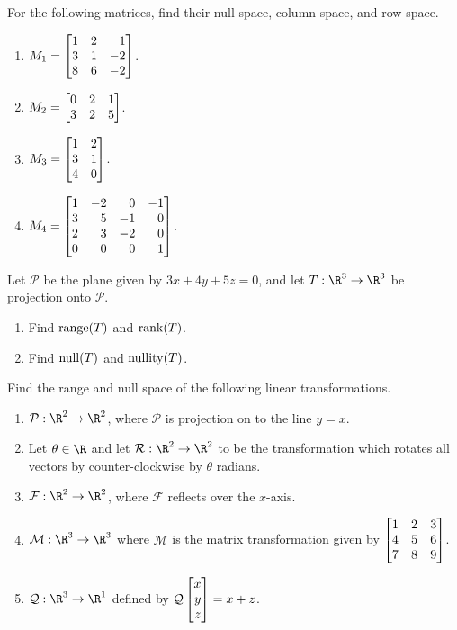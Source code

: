 \begin{exercises}
	\begin{problist}
		\prob For the following matrices, find their null space, column space,
		and row space.
		\begin{enumerate}
			\item $M_{1}=\mat{1&2&1\\3&1&-2\\8&6&-2}$.

			\item $M_{2}=\mat{0&2&1\\3&2&5}$.

			\item $M_{3}=\mat{1&2\\3&1\\4&0}$.

			\item $M_{4}=\mat{1&-2&0&-1\\3&5&-1&0\\2&3&-2&0\\0&0&0&1}$.
		\end{enumerate}

		\prob Let $\mathcal P$ be the plane given by $3x+4y+5z=0$, and
		let $T:\R^{3}\to\R^{3}$ be projection onto $\mathcal P$.
		\begin{enumerate}
			\item Find $\operatorname{range}(T)$ and $\operatorname{rank}(T)$.

			\item Find $\operatorname{null}(T)$ and $\operatorname{nullity}(T)$.
		\end{enumerate}

		\prob Find the range and null space of the following linear
		transformations.
		\begin{enumerate}
			\item $\mathcal P:\R^{2}\to\R^{2}$, where
				$\mathcal P$ is projection on to the line
				$y=x$.

			\item Let $\theta\in \R$ and let $\mathcal R:\R^{2}\to\R^{2}$
				to be the transformation which rotates all vectors
				by counter-clockwise by $\theta$ radians.

			\item $\mathcal F:\R^{2}\to\R^{2}$, where
				$\mathcal F$ reflects over the $x$-axis.

			\item $\mathcal M:\R^3\to\R^3$ where $\mathcal M$ is the matrix
				transformation given by $\mat{1&2&3\\4&5&6\\7&8&9}$.
			\item $\mathcal Q:\R^3\to\R^1$ defined by $\mathcal Q\mat{x\\y\\z}=x+z$.
		\end{enumerate}


\end{problist}
\end{exercises}
